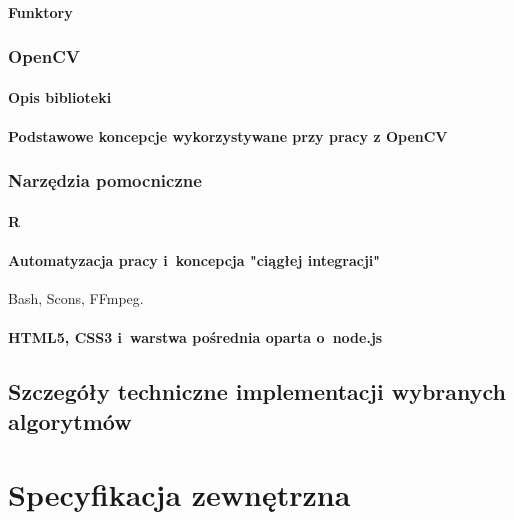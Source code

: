       \subsubsection{Funktory}

    \subsection{OpenCV}\label{Subsection_OpenCV}

      \subsubsection{Opis biblioteki}
        \cite{LearningOpenCV}

      \subsubsection{Podstawowe koncepcje wykorzystywane przy pracy z OpenCV}
        \cite{OpenCVCookbook}

    \subsection{Narzędzia pomocniczne}\label{Subsection_PomocniczeTechnologie}

      \subsubsection{R}

      \subsubsection{Automatyzacja pracy i~koncepcja "ciągłej integracji"}
        Bash, Scons, FFmpeg.

      \subsubsection{HTML5, CSS3 i~warstwa pośrednia oparta o~node.js}

  \section{Szczegóły techniczne implementacji wybranych algorytmów}

\chapter{Specyfikacja zewnętrzna}\label{Chapter_SpecyfikacjaZewnetrzna}

